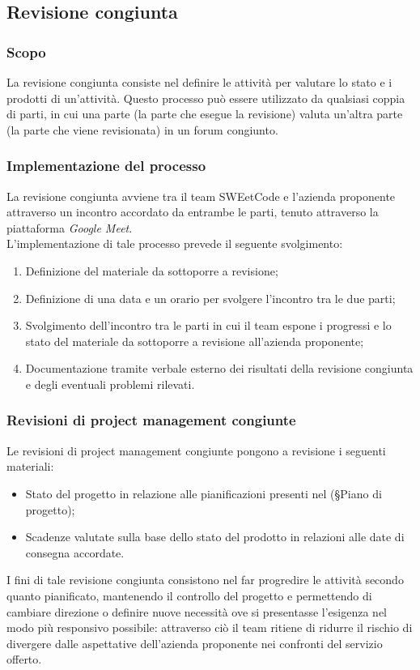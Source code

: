 \documentclass[10pt, a4paper]{article}
\begin{document}
\subsection{Revisione congiunta}

\subsubsection{Scopo}
La revisione congiunta consiste nel definire le attività per valutare lo stato e i prodotti di un'attività. Questo processo può 
essere utilizzato da qualsiasi coppia di parti, in cui una parte (la parte che esegue la revisione) valuta un'altra parte (la parte che viene 
revisionata) in un forum congiunto.

\subsubsection{Implementazione del processo}
La revisione congiunta avviene tra il team SWEetCode e l'azienda proponente attraverso un incontro accordato da entrambe le parti, tenuto attraverso
la piattaforma \textit{Google Meet}.\\
L'implementazione di tale processo prevede il seguente svolgimento:
\begin{enumerate}
    \item Definizione del materiale da sottoporre a revisione;
    \item Definizione di una data e un orario per svolgere l'incontro tra le due parti;
    \item Svolgimento dell'incontro tra le parti in cui il team espone i progressi e lo stato del materiale da sottoporre a revisione all'azienda 
    proponente;
    \item Documentazione tramite verbale esterno dei risultati della revisione congiunta e degli eventuali problemi rilevati.
\end{enumerate}

\subsubsection{Revisioni di project management congiunte}
Le revisioni di project management congiunte pongono a revisione i seguenti materiali:
\begin{itemize}
    \item Stato del progetto in relazione alle pianificazioni presenti nel (\S Piano di progetto);
    \item Scadenze valutate sulla base dello stato del prodotto in relazioni alle date di consegna accordate.
\end{itemize}
I fini di tale revisione congiunta consistono nel far progredire le attività secondo quanto pianificato, mantenendo il controllo del progetto e 
permettendo di cambiare direzione o definire nuove necessità ove si presentasse l'esigenza nel modo più responsivo possibile: attraverso ciò il team
ritiene di ridurre il rischio di divergere dalle aspettative dell'azienda proponente nei confronti del servizio offerto.
\end{document}

